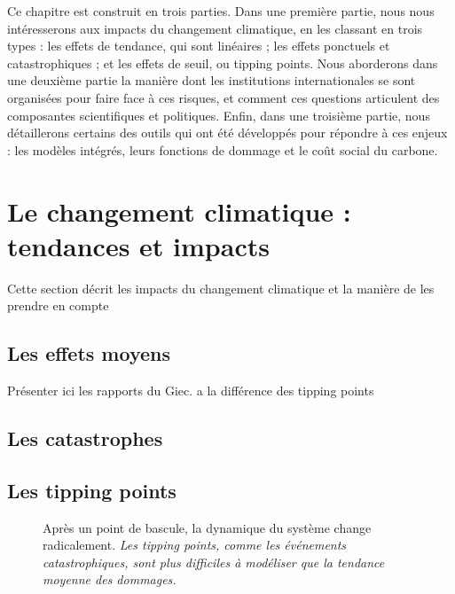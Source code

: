 Ce chapitre est construit en trois parties. Dans une première partie, nous nous intéresserons aux impacts du changement climatique, en les classant en trois types : les effets de tendance, qui sont linéaires ; les effets ponctuels et catastrophiques ; et les effets de seuil, ou tipping points. Nous aborderons dans une deuxième partie la manière dont les institutions internationales se sont organisées pour faire face à ces risques, et comment ces questions articulent des composantes scientifiques et politiques. Enfin, dans une troisième partie, nous détaillerons certains des outils qui ont été développés pour répondre à ces enjeux : les modèles intégrés, leurs fonctions de dommage et le coût social du carbone. 




\section{Le changement climatique : tendances et impacts}
\label{sect/1/1}

Cette section décrit les impacts du changement climatique et la manière de les prendre en compte

\subsection{Les effets moyens}
\label{sect/1/1/1}


Présenter ici les rapports du Giec. a la différence des tipping points

\subsection{Les catastrophes}
\label{sect/1/1/2}

\subsection{Les tipping points}
\label{sect/1/1/3}

\begin{figure}
    \centering
    \caption{Après un point de bascule, la dynamique du système change radicalement. \textit{Les tipping points, comme les événements catastrophiques, sont plus difficiles à modéliser que la tendance moyenne des dommages. }}
    \label{fig:tipping-point}
\end{figure}

